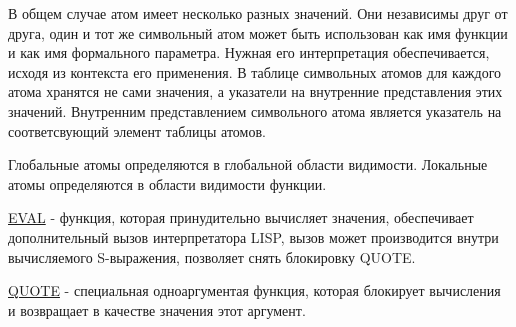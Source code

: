 В общем случае атом имеет несколько разных значений. Они независимы друг от
друга, один и тот же символьный атом может быть использован как имя функции и как имя формального параметра. Нужная его интерпретация обеспечивается, исходя из контекста его применения. В таблице символьных атомов для каждого атома хранятся не сами значения, а указатели на внутренние представления 
этих значений. Внутренним представлением символьного атома является указатель на соответсвующий элемент таблицы атомов. 


Глобальные атомы определяются в глобальной области видимости. 
Локальные атомы определяются в области видимости функции. 

\newline
\underline{EVAL} - функция, которая принудительно вычисляет значения, обеспечивает дополнительный вызов интерпретатора LISP, вызов может производится внутри вычисляемого S-выражения, позволяет снять блокировку QUOTE.

\newline
\underline{QUOTE} - специальная одноаргументая функция, которая блокирует вычисления и возвращает в качестве значения этот аргумент.
